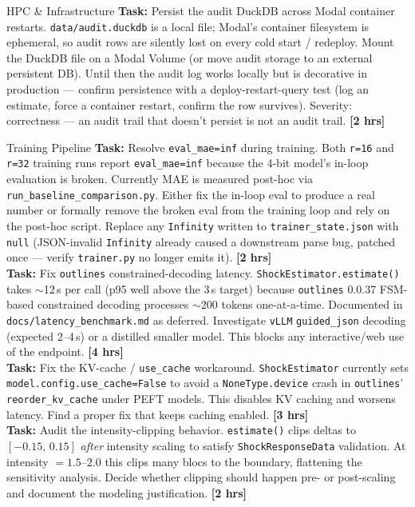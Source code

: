 \documentclass[11pt]{article}
\newcommand{\hrs}[1]{\textbf{[#1 hrs]}}
\newcommand{\task}[2]{%
  \noindent\textbf{Task:} #1 \hfill \hrs{#2}\\}
\begin{document}
\begin{taskbox}{HPC \& Infrastructure}
\task{Persist the audit DuckDB across Modal container restarts.
  \texttt{data/audit.duckdb} is a local file; Modal's container filesystem
  is ephemeral, so audit rows are silently lost on every cold start /
  redeploy. Mount the DuckDB file on a Modal Volume (or move audit storage
  to an external persistent DB). Until then the audit log works locally
  but is decorative in production --- confirm persistence with a
  deploy-restart-query test (log an estimate, force a container restart,
  confirm the row survives). Severity: correctness --- an audit trail that
  doesn't persist is not an audit trail.}{2}
\end{taskbox}

\begin{taskbox}{Training Pipeline}
\task{Resolve \texttt{eval\_mae=inf} during training. Both \texttt{r=16} and
  \texttt{r=32} training runs report \texttt{eval\_mae=inf} because the 4-bit
  model's in-loop evaluation is broken. Currently MAE is measured post-hoc
  via \texttt{run\_baseline\_comparison.py}. Either fix the in-loop eval to
  produce a real number or formally remove the broken eval from the training
  loop and rely on the post-hoc script. Replace any \texttt{Infinity} written
  to \texttt{trainer\_state.json} with \texttt{null} (JSON-invalid
  \texttt{Infinity} already caused a downstream parse bug, patched once ---
  verify \texttt{trainer.py} no longer emits it).}{2}

\task{Fix \texttt{outlines} constrained-decoding latency.
  \texttt{ShockEstimator.estimate()} takes $\sim$12\,s per call (p95 well
  above the 3\,s target) because \texttt{outlines} 0.0.37 FSM-based
  constrained decoding processes $\sim$200 tokens one-at-a-time. Documented
  in \texttt{docs/latency\_benchmark.md} as deferred. Investigate \texttt{vLLM}
  \texttt{guided\_json} decoding (expected 2--4\,s) or a distilled smaller
  model. This blocks any interactive/web use of the endpoint.}{4}

\task{Fix the KV-cache / \texttt{use\_cache} workaround. \texttt{ShockEstimator}
  currently sets \texttt{model.config.use\_cache=False} to avoid a
  \texttt{NoneType.device} crash in \texttt{outlines}' \texttt{reorder\_kv\_cache}
  under PEFT models. This disables KV caching and worsens latency. Find a
  proper fix that keeps caching enabled.}{3}

\task{Audit the intensity-clipping behavior. \texttt{estimate()} clips deltas
  to $[-0.15,\, 0.15]$ \emph{after} intensity scaling to satisfy
  \texttt{ShockResponseData} validation. At intensity $= 1.5$--$2.0$ this
  clips many blocs to the boundary, flattening the sensitivity analysis.
  Decide whether clipping should happen pre- or post-scaling and document
  the modeling justification.}{2}
\end{taskbox}
\end{document}
